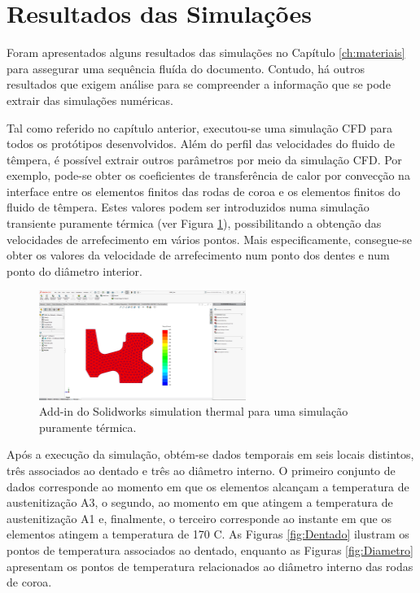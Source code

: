 \section{Resultados das Simulações} \label{sec:resultados_simulacoes}
Foram apresentados alguns resultados das simulações no Capítulo \ref{ch:materiais} para assegurar uma sequência fluída do documento. Contudo, há outros resultados que exigem análise para se compreender a informação que se pode extrair das simulações numéricas.
\par
Tal como referido no capítulo anterior, executou-se uma simulação CFD para todos os protótipos desenvolvidos. Além do perfil das velocidades do fluido de têmpera, é possível extrair outros parâmetros por meio da simulação CFD. Por exemplo, pode-se obter os coeficientes de transferência de calor por convecção na interface entre os elementos finitos das rodas de coroa e os elementos finitos do fluido de têmpera. Estes valores podem ser introduzidos numa simulação transiente puramente térmica (ver Figura \ref{fig:simulacao_termica}), possibilitando a obtenção das velocidades de arrefecimento em vários pontos. Mais especificamente, consegue-se obter os valores da velocidade de arrefecimento num ponto dos dentes e num ponto do diâmetro interior.
\begin{figure}[htb]
    \centering
    \includegraphics[width = 0.6\textwidth]{Figures/Cap4/Solidworks_thermal.png}
    \caption[Simulação puramente térmica Solidworks]%
    {Add-in do Solidworks simulation thermal para uma simulação puramente térmica.}
    \label{fig:simulacao_termica}
\end{figure}
\par
Após a execução da simulação, obtém-se dados temporais em seis locais distintos, três associados ao dentado e três ao diâmetro interno. O primeiro conjunto de dados corresponde ao momento em que os elementos alcançam a temperatura de austenitização A3, o segundo, ao momento em que atingem a temperatura de austenitização A1 e, finalmente, o terceiro corresponde ao instante em que os elementos atingem a temperatura de 170 \textdegree C. As Figuras \ref{fig:Dentado} ilustram os pontos de temperatura associados ao dentado, enquanto as Figuras \ref{fig:Diametro} apresentam os pontos de temperatura relacionados ao diâmetro interno das rodas de coroa.
